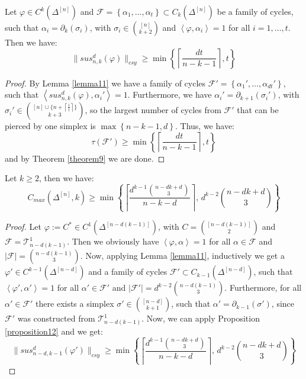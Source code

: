 \begin{prop}\label{proposition12}
Let \(\varphi\in C^k(\Delta^{[n]})\) and \(\mathcal{F}=\left\{\alpha_1,\ldots,\alpha_t\right\}\subset C_k(\Delta^{[n]})\) be a family of cycles, such that \(\alpha_i=\partial_k(\sigma_i)\), with \(\sigma_i\in\binom{[n]}{k+2}\) and \(\left\langle\varphi,\alpha_i\right\rangle=1\) for all \(i=1,\ldots,t\). Then we have:
\[
\|sus_{n,k}^d(\varphi)\|_{csy}\geq\min\left\{\left\lceil\frac{dt}{n-k-1}\right\rceil,t\right\}
\]
\begin{proof}
By Lemma \ref{lemma11} we have a family of cycles \(\mathcal{F}'=\left\{\alpha_1',\ldots,\alpha_{dt}'\right\}\), such that \(\left\langle sus_{n,k}^d(\varphi),\alpha_i'\right\rangle=1\). Furthermore, we have \(\alpha_i'=\partial_{k+1}(\sigma_i')\), with\\
\(\sigma_i'\in\binom{[n]\cup\{n+\left\lceil\frac{i}{t}\right\rceil\}}{k+3}\), so the largest number of cycles from \(\mathcal{F}'\) that can be pierced by one simplex is \(\max\left\{n-k-1,d\right\}\). Thus, we have:
\[
\tau(\mathcal{F}')\geq\min\left\{\left\lceil\frac{dt}{n-k-1}\right\rceil,t\right\}
\]
and by Theorem \ref{theorem9} we are done.
\end{proof}
\end{prop}

\begin{thm}\label{theorem8}
Let \(k\geq 2\), then we have:
\[
C_{max}(\Delta^{[n]},k)\geq\min\left\{\left\lceil\frac{d^{k-1}\binom{n-dk+d}{3}}{n-k-d}\right\rceil\text{, }d^{k-2}\binom{n-dk+d}{3}\right\}
\]
\begin{proof}
Let \(\varphi:=C^*\in C^1(\Delta^{[n-d(k-1)]})\), with \(C=\binom{[n-d(k-1)]}{2}\) and\\
\(\mathcal{F}=\mathcal{T}_{n-d(k-1)}^1\). Then we obviously have \(\left\langle\varphi,\alpha\right\rangle=1\) for all \(\alpha\in\mathcal{F}\) and\\
\(\left|\mathcal{F}\right|=\binom{n-d(k-1)}{3}\). Now, applying Lemma \ref{lemma11}, inductively we get a\\
\(\varphi'\in C^{k-1}(\Delta^{[n-d]})\) and a family of cycles \(\mathcal{F}'\subset C_{k-1}(\Delta^{[n-d]})\), such that\\
\(\left\langle\varphi',\alpha'\right\rangle=1\) for all \(\alpha'\in\mathcal{F}'\) and \(\left|\mathcal{F}'\right|=d^{k-2}\binom{n-d(k-1)}{3}\). Furthermore, for all \(\alpha'\in\mathcal{F}'\) there exists a simplex \(\sigma'\in\binom{[n-d]}{k+1}\), such that \(\alpha'=\partial_{k-1}(\sigma')\), since \(\mathcal{F}'\) was constructed from \(\mathcal{T}_{n-d(k-1)}^1\). Now, we can apply Proposition \ref{proposition12} and we get:
\[
\|sus_{n-d,k-1}^{d}(\varphi')\|_{csy}\geq\min\left\{\left\lceil\frac{d^{k-1}\binom{n-dk+d}{3}}{n-k-d}\right\rceil\text{, }d^{k-2}\binom{n-dk+d}{3}\right\}
\]
\end{proof}
\end{thm}

